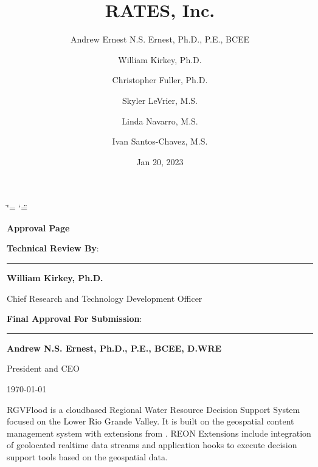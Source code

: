 \documentclass[letterpaper,12pt,english,openany,oneside]{sphinxmanual}
\title{RATES, Inc.}
\date{Jan 20, 2023}
\author{Andrew Ernest N.S. Ernest, Ph.D., P.E., BCEE \and William Kirkey, Ph.D. \and Christopher Fuller, Ph.D. \and Skyler LeVrier, M.S. \and Linda Navarro, M.S. \and Ivan Santos-Chavez, M.S.}
\begin{document}
\ifdefined\shorthandoff
  \ifnum\catcode`\=\string=\active\shorthandoff{=}\fi
  \ifnum\catcode`\"=\active{}\fi
\fi

\pagestyle{empty}
 
\sphinxmaketitle
    \newcommand\signature[3]{%
    {\sffamily
    \vspace{1cm}\par
    \textbf{#1}:\par
        \begin{minipage}{10cm}
        \centering
        \vspace{3cm}\par
        \rule{10cm}{1pt}\par
        \textbf{#2}\par
        #3%
        \end{minipage}
    }
    }
    \newcommand\insertdate[1][\today]{\vfill\begin{flushright}#1\end{flushright}}
    {\LARGE\sffamily \textbf{Approval Page}}
    
    \signature{Technical Review By}{William Kirkey, Ph.D.}{Chief Research and Technology Development Officer}
    
    \signature{Final Approval For Submission}{Andrew N.S. Ernest, Ph.D., P.E., BCEE, D.WRE}{President and CEO}
        
    \insertdate

\pagestyle{plain}
\sphinxtableofcontents
\pagestyle{normal}
\label{\detokenize{index::doc}}


\sphinxAtStartPar
RGVFlood is a cloud\sphinxhyphen{}based Regional Water Resource Decision Support System focused on the Lower Rio Grande Valley. It is built on the {\hyperref[\detokenize{_static/glossary:term-0}]{}} geospatial content management system with extensions from {\hyperref[\detokenize{_static/glossary:term-REON}]{}}. REON Extensions include integration of geolocated real\sphinxhyphen{}time data streams and application hooks to execute decision support tools based on the geospatial data.

\sphinxstepscope
\end{document}
